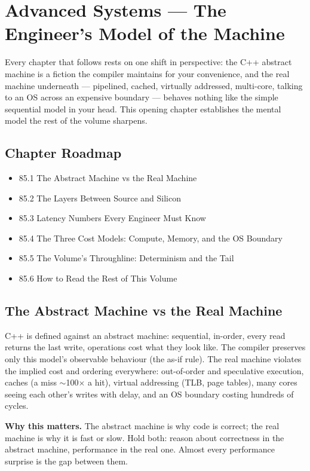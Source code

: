 \chapter{Advanced Systems --- The Engineer's Model of the Machine}

Every chapter that follows rests on one shift in perspective: the C++ abstract machine is a fiction the compiler maintains for your convenience, and the real machine underneath --- pipelined, cached, virtually addressed, multi-core, talking to an OS across an expensive boundary --- behaves nothing like the simple sequential model in your head. This opening chapter establishes the mental model the rest of the volume sharpens.

\section*{Chapter Roadmap}
\begin{itemize}
\item 85.1 The Abstract Machine vs the Real Machine
\item 85.2 The Layers Between Source and Silicon
\item 85.3 Latency Numbers Every Engineer Must Know
\item 85.4 The Three Cost Models: Compute, Memory, and the OS Boundary
\item 85.5 The Volume's Throughline: Determinism and the Tail
\item 85.6 How to Read the Rest of This Volume
\end{itemize}

\section{The Abstract Machine vs the Real Machine}
C++ is defined against an abstract machine: sequential, in-order, every read returns the last write, operations cost what they look like. The compiler preserves only this model's observable behaviour (the as-if rule). The real machine violates the implied cost and ordering everywhere: out-of-order and speculative execution, caches (a miss $\sim$100$\times$ a hit), virtual addressing (TLB, page tables), many cores seeing each other's writes with delay, and an OS boundary costing hundreds of cycles.

\textbf{Why this matters.} The abstract machine is why code is correct; the real machine is why it is fast or slow. Hold both: reason about correctness in the abstract machine, performance in the real one. Almost every performance surprise is the gap between them.

